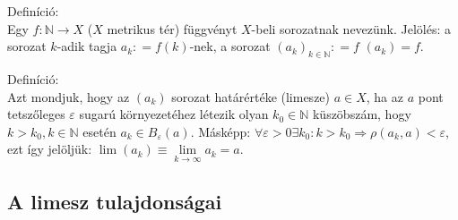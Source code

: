 \documentclass[12pt,a4paper]{scrartcl}
\newenvironment{definicio}{}{}
\begin{document}
\begin{definicio}

Definíció:\\
Egy \(\left. f:{\mathbb{N}}\rightarrow X \right.\) (\(X\) metrikus tér)
függvényt \(X\)-beli sorozatnak nevezünk. Jelölés: a sorozat \(k\)-adik
tagja \(a_{k}: = f\left( k \right)\)-nek, a sorozat
\(\left( a_{k} \right)_{k \in {\mathbb{N}}}: = f\)
\(\left( a_{k} \right) = f\).

\end{definicio}

\begin{definicio}

Definíció:\\
Azt mondjuk, hogy az \(\left( a_{k} \right)\) sorozat határértéke
(limesze) \(a \in X\), ha az \(a\) pont tetszőleges \(\varepsilon\)
sugarú környezetéhez létezik olyan \(k_{0} \in {\mathbb{N}}\)
küszöbszám, hogy \(k > k_{0},k \in {\mathbb{N}}\) esetén
\(a_{k} \in B_{\varepsilon}\left( a \right)\). Másképp:
\(\left. \forall\varepsilon > 0\exists k_{0}:k > k_{0}\Rightarrow\rho\left( {a_{k},a} \right) < \varepsilon \right.\),
ezt így jelöljük:
\({\lim\left( a_{k} \right) \equiv \underset{k\rightarrow\infty}{\lim}a_{k} = a}.\)

\end{definicio}

\hypertarget{a-limesz-tulajdonsagai}{%
\subsection{A limesz tulajdonságai}\label{a-limesz-tulajdonsagai}}
\end{document}
